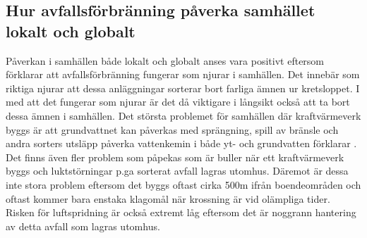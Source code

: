 \documentclass[11p]{article}
\begin{document}
    \subsection{Hur avfallsförbränning påverka samhället lokalt och globalt}
    Påverkan i samhällen både lokalt och globalt anses vara positivt eftersom \textcite{stockholmenergi} förklarar att avfallsförbränning fungerar som njurar i samhällen.
    Det innebär som riktiga njurar att dessa anläggningar sorterar bort farliga ämnen ur kretsloppet.
    I med att det fungerar som njurar är det då viktigare i långsikt också att ta bort dessa ämnen i samhällen.
    Det största problemet för samhällen där kraftvärmeverk byggs är att grundvattnet kan påverkas med sprängning, spill av bränsle och andra sorters utsläpp påverka vattenkemin i både yt- och grundvatten förklarar \textcite{MKBKraftVarme}.
    Det finns även fler problem som påpekas som är buller när ett kraftvärmeverk byggs och luktstörningar p.ga sorterat avfall lagras utomhus.
    Däremot är dessa inte stora problem eftersom det byggs oftast cirka 500m ifrån boendeområden och oftast kommer bara enstaka klagomål när krossning är vid olämpliga tider.
    Risken för luftspridning är också extremt låg eftersom det är noggrann hantering av detta avfall som lagras utomhus.

    \printbibliography
\end{document}
